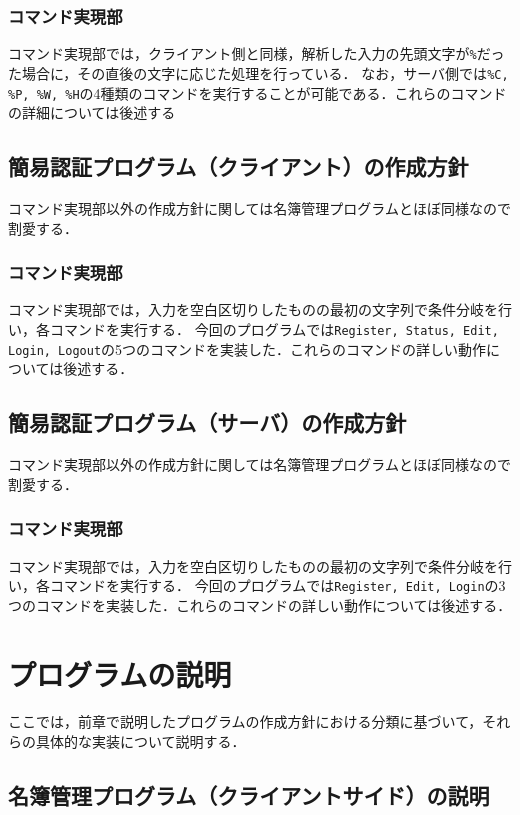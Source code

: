 \documentclass[11pt]{jsarticle}
\begin{document}
\subsubsection{コマンド実現部}
コマンド実現部では，クライアント側と同様，解析した入力の先頭文字が{\tt \%}だった場合に，その直後の文字に応じた処理を行っている．
なお，サーバ側では{\tt \%C, \%P, \%W, \%H}の4種類のコマンドを実行することが可能である．これらのコマンドの詳細については後述する

\subsection{簡易認証プログラム（クライアント）の作成方針}

コマンド実現部以外の作成方針に関しては名簿管理プログラムとほぼ同様なので割愛する．

\subsubsection{コマンド実現部}
コマンド実現部では，入力を空白区切りしたものの最初の文字列で条件分岐を行い，各コマンドを実行する．
今回のプログラムでは{\tt Register, Status, Edit, Login, Logout}の5つのコマンドを実装した．これらのコマンドの詳しい動作については後述する．

\subsection{簡易認証プログラム（サーバ）の作成方針}

コマンド実現部以外の作成方針に関しては名簿管理プログラムとほぼ同様なので割愛する．

\subsubsection{コマンド実現部}
コマンド実現部では，入力を空白区切りしたものの最初の文字列で条件分岐を行い，各コマンドを実行する．
今回のプログラムでは{\tt Register, Edit, Login}の3つのコマンドを実装した．これらのコマンドの詳しい動作については後述する．

\section{プログラムの説明}

ここでは，前章で説明したプログラムの作成方針における分類に基づいて，それらの具体的な実装について説明する．

\subsection{名簿管理プログラム（クライアントサイド）の説明}
\end{document}
